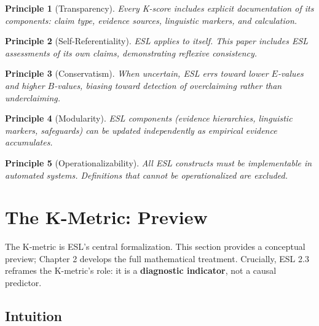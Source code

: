 \documentclass[11pt,a4paper]{article}
\newtheorem{principle}{Principle}[section]
\begin{document}
\begin{principle}[Transparency]
\label{princ:transparency}
Every K-score includes explicit documentation of its components: claim type, evidence sources, linguistic markers, and calculation.
\end{principle}

\begin{principle}[Self-Referentiality]
\label{princ:self-referentiality}
ESL applies to itself. This paper includes ESL assessments of its own claims, demonstrating reflexive consistency.
\end{principle}

\begin{principle}[Conservatism]
\label{princ:conservatism}
When uncertain, ESL errs toward lower $E$-values and higher $B$-values, biasing toward detection of overclaiming rather than underclaiming.
\end{principle}

\begin{principle}[Modularity]
\label{princ:modularity}
ESL components (evidence hierarchies, linguistic markers, safeguards) can be updated independently as empirical evidence accumulates.
\end{principle}

\begin{principle}[Operationalizability]
\label{princ:operationalizability}
All ESL constructs must be implementable in automated systems. Definitions that cannot be operationalized are excluded.
\end{principle}


\section{The K-Metric: Preview}
\label{sec:k-metric-preview}

The K-metric is ESL's central formalization. This section provides a conceptual preview; Chapter 2 develops the full mathematical treatment. Crucially, ESL 2.3 reframes the K-metric's role: it is a \textbf{diagnostic indicator}, not a causal predictor.

\subsection{Intuition}
\end{document}

